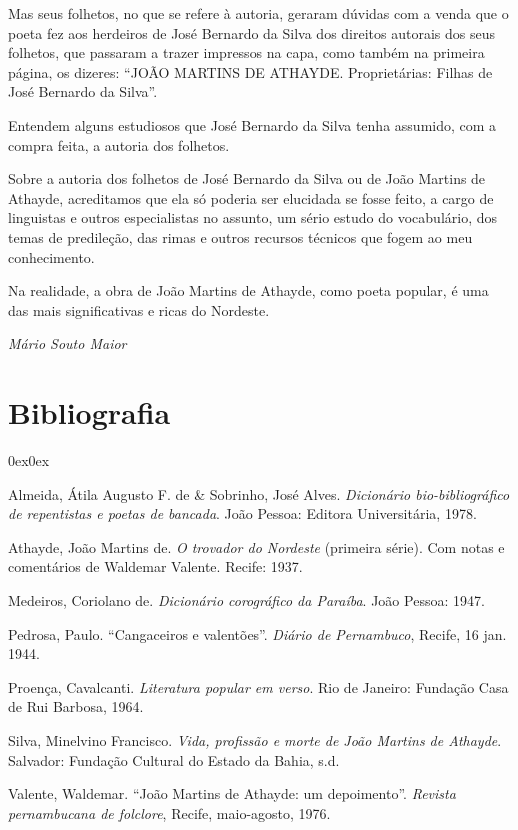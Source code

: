 Mas seus folhetos, no que se refere à autoria, geraram
dúvidas com a venda que o poeta fez aos herdeiros de José
Bernardo da Silva dos direitos autorais dos seus folhetos,
que passaram a trazer impressos na capa, como também
na primeira página, os dizeres: ``JOÃO MARTINS DE
ATHAYDE. Proprietárias: Filhas de José Bernardo da
Silva''.

Entendem alguns estudiosos que José Bernardo da Silva
tenha assumido, com a compra feita, a autoria dos folhetos.

Sobre a autoria dos folhetos de José Bernardo da Silva
ou de João Martins de Athayde, acreditamos que ela só
poderia ser elucidada se fosse feito, a cargo de linguistas e
outros especialistas no assunto, um sério estudo do
vocabulário, dos temas de predileção, das rimas e outros
recursos técnicos que fogem ao meu conhecimento.

Na realidade, a obra de João Martins de Athayde, como
poeta popular, é uma das mais significativas e ricas do
Nordeste.

\begin{flushright}
\textit{Mário Souto Maior}\\
\end{flushright}


\section{Bibliografia}

\begin{description}0ex\parsep0ex

\item Almeida, Átila Augusto F. de \& Sobrinho, José Alves.
\textit{Dicionário bio-bibliográfico de repentistas e poetas de
bancada}. João Pessoa: Editora Universitária, 1978.

\item Athayde, João Martins de. \textit{O trovador do Nordeste} (primeira
série). Com notas e comentários de Waldemar Valente.
Recife: 1937.

\item Medeiros, Coriolano de. \textit{Dicionário corográfico da Paraíba}.
João Pessoa: 1947.

\item Pedrosa, Paulo. ``Cangaceiros e valentões''. \textit{Diário de
Pernambuco}, Recife, 16 jan. 1944.

\item Proença, Cavalcanti. \textit{Literatura popular em verso}. Rio de
Janeiro: Fundação Casa de Rui Barbosa, 1964.

\item Silva, Minelvino Francisco. \textit{Vida, profissão e morte de João
Martins de Athayde}. Salvador: Fundação Cultural do
Estado da Bahia, s.d.

\item Valente, Waldemar. ``João Martins de Athayde: um
depoimento''. \textit{Revista pernambucana de folclore}, Recife,
maio-agosto, 1976.

\end{description}